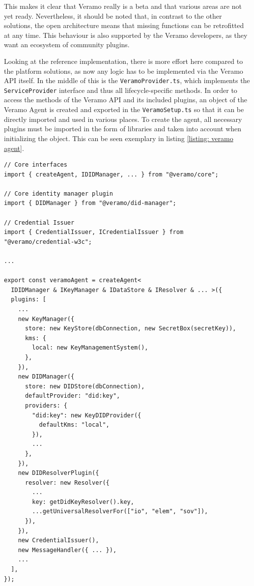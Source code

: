     This makes it clear that Veramo really is a beta and that various areas are not yet ready. Nevertheless, it should be noted that, in contrast to the other solutions, the open architecture means that missing functions can be retrofitted at any time. This behaviour is also supported by the Veramo developers, as they want an ecosystem of community plugins.
    
    Looking at the reference implementation, there is more effort here compared to the platform solutions, as now any logic has to be implemented via the Veramo API itself. In the middle of this is the \texttt{VeramoProvider.ts}, which implements the \texttt{ServiceProvider} interface and thus all lifecycle-specific methods. In order to access the methods of the Veramo API and its included plugins, an object of the Veramo Agent is created and exported in the \texttt{VeramoSetup.ts} so that it can be directly imported and used in various places. To create the agent, all necessary plugins must be imported in the form of libraries and taken into account when initializing the object. This can be seen exemplary in listing \ref{listing: veramo agent}. 
    \newline
    \begin{lstlisting}[style=ES6, caption=Veramo agent creation, label={listing: veramo agent}]
// Core interfaces
import { createAgent, IDIDManager, ... } from "@veramo/core";

// Core identity manager plugin
import { DIDManager } from "@veramo/did-manager";

// Credential Issuer
import { CredentialIssuer, ICredentialIssuer } from "@veramo/credential-w3c";

...

export const veramoAgent = createAgent<
  IDIDManager & IKeyManager & IDataStore & IResolver & ... >({
  plugins: [
    ...
    new KeyManager({
      store: new KeyStore(dbConnection, new SecretBox(secretKey)),
      kms: {
        local: new KeyManagementSystem(),
      },
    }),
    new DIDManager({
      store: new DIDStore(dbConnection),
      defaultProvider: "did:key",
      providers: {
        "did:key": new KeyDIDProvider({
          defaultKms: "local",
        }),
        ...
      },
    }),
    new DIDResolverPlugin({
      resolver: new Resolver({
        ...
        key: getDidKeyResolver().key,
        ...getUniversalResolverFor(["io", "elem", "sov"]),
      }),
    }),
    new CredentialIssuer(),
    new MessageHandler({ ... }),
    ...
  ],
});\end{lstlisting}
    
